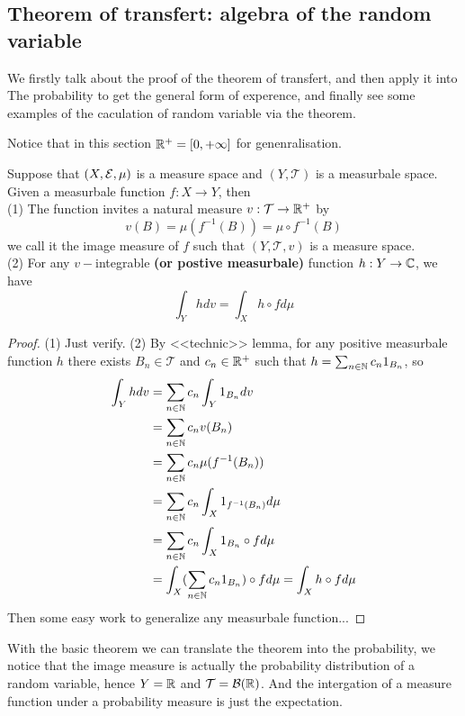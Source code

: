 \documentclass[en,geye,blue,normal,12pt,bibend=bibtex]{elegantnote}
\begin{document}
\subsection{Theorem of transfert: algebra of the random variable}
We firstly talk about the proof of the theorem of transfert, and then apply it into The probability to get the general form of experence, and finally see some examples of the caculation of random variable via the theorem.

Notice that in this section \(\mathbb{R}^+ = [0, +\infty]\) for genenralisation.

\begin{theorem}[Transfert]
    Suppose that \((X,\mathcal{E} ,\mu)\) is a measure space and \((Y,\mathcal{T})\) is a measurbale space. Given a measurbale function \(f: X \to Y\), then
    \\(1) The function invites a natural measure \(v: \mathcal{T} \to \mathbb{R}^+\) by
    \[v(B) = \mu(f^{-1}(B))= \mu \circ f^{-1}(B)\] we call it the image measure of \(f\) such that \((Y,\mathcal{T},v)\) is a measure space.
    \\(2) For any \(v-\)integrable \textbf{(or postive measurbale)} function \(h:Y \to \mathbb{C}\), we have
    \[\int_{Y}hdv = \int_{X}h\circ f d\mu\]

    \begin{proof}
        (1) Just verify.
        (2) By <<technic>> lemma, for any positive measurbale function \(h\) there exists \(B_n \in \mathcal{T}\) and \(c_n \in \mathbb{R}^+\) such that \(h = \sum_{n \in \mathbb{N}} c_n 1_{B_n}\), so
        \begin{align*}
            \int_Y hdv  &= \sum_{n \in \mathbb{N}} c_n \int_Y 1_{B_n} dv \\
            &= \sum_{n \in \mathbb{N}} c_n v(B_n)  \\
            &= \sum_{n \in \mathbb{N}} c_n \mu(f^{-1}(B_n))  \\
            &= \sum_{n \in \mathbb{N}} c_n \int_X 1_{f^{-1}(B_n)} d\mu \\
            &= \sum_{n \in \mathbb{N}} c_n \int_X 1_{B_n}\circ f d\mu \\
            &= \int_X(\sum_{n \in \mathbb{N}} c_n1_{B_n})\circ f d\mu = \int_X h \circ f d\mu
        \end{align*}
        Then some easy work to generalize any measurbale function...
    \end{proof}
\end{theorem}

With the basic theorem we can translate the theorem into the probability, we notice that the image measure is actually the probability distribution of a random variable, hence \(Y = \mathbb{R}\) and \(\mathcal{T} = \mathcal{B}(\mathbb{R})\). And the intergation of a measure function under a probability measure is just the expectation.
\end{document}

